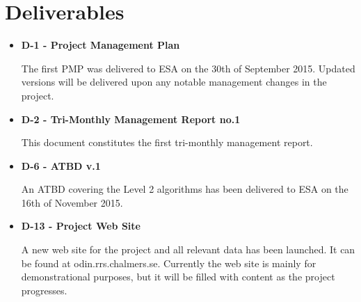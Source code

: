 \section{Deliverables}

\begin{itemize}

\item{\bf D-1 - Project Management Plan}

The first PMP was delivered to ESA on the 30th of September 2015. Updated versions will be delivered upon any notable management changes in the project.

\item{\bf D-2 - Tri-Monthly Management Report no.1}

This document constitutes the first tri-monthly management report. 

\item{\bf D-6 - ATBD v.1}

An ATBD covering the Level 2 algorithms has been delivered to ESA on the 16th of November 2015.

\item{\bf D-13 - Project Web Site}

A new web site for the project and all relevant data has been launched. It can be found at odin.rrs.chalmers.se. Currently the web site is mainly for demonstrational purposes, but it will be filled with content as the project progresses. 

\end{itemize}

